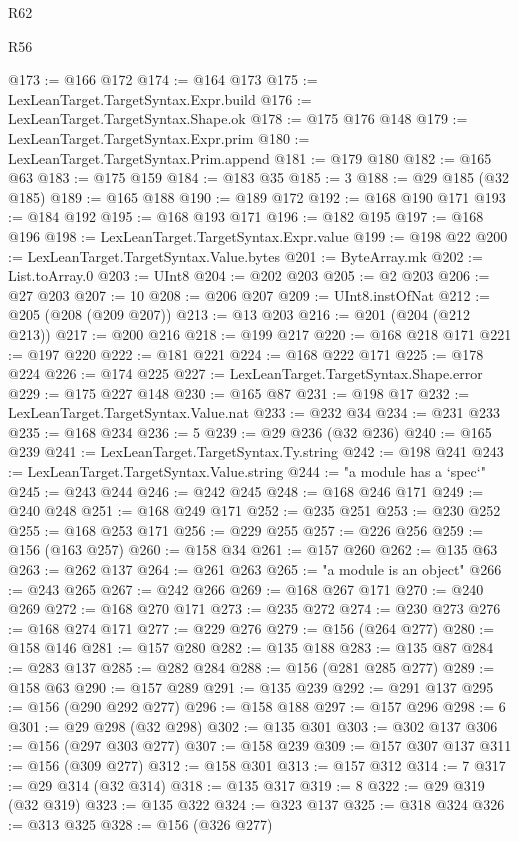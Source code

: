 \begin{lexlean}{R62}
\begin{lexlean}{R56}
\begin{coremodule}
{{{{{{{{{{{{{{{{{{{{{{{{{{{{{{{{{{{{{{{{{{{{{{{{{{{{{{{{{{{{{{{{{{{{{{{{{{{{{{{{{{{{{{{{{{{{{{{{{{{{{{{{{{{{{{{{{{{{{{{{{{{{{{{{{{{{{{{{{{{{{{{{{{{{{{{{{{{{{{{{{{{{{{{{{{{{{{{{{{{{{{{{{{{{{{{{{{{{{{{{{{{{{{{{{{{@173 := @166 @172
@174 := @164 @173
@175 := LexLeanTarget.TargetSyntax.Expr.build
@176 := LexLeanTarget.TargetSyntax.Shape.ok
@178 := @175 @176 @148
@179 := LexLeanTarget.TargetSyntax.Expr.prim
@180 := LexLeanTarget.TargetSyntax.Prim.append
@181 := @179 @180
@182 := @165 @63
@183 := @175 @159
@184 := @183 @35
@185 := 3
@188 := @29 @185 (@32 @185)
@189 := @165 @188
@190 := @189 @172
@192 := @168 @190 @171
@193 := @184 @192
@195 := @168 @193 @171
@196 := @182 @195
@197 := @168 @196
@198 := LexLeanTarget.TargetSyntax.Expr.value
@199 := @198 @22
@200 := LexLeanTarget.TargetSyntax.Value.bytes
@201 := ByteArray.mk
@202 := List.toArray.{0}
@203 := UInt8
@204 := @202 @203
@205 := @2 @203
@206 := @27 @203
@207 := 10
@208 := @206 @207
@209 := UInt8.instOfNat
@212 := @205 (@208 (@209 @207))
@213 := @13 @203
@216 := @201 (@204 (@212 @213))
@217 := @200 @216
@218 := @199 @217
@220 := @168 @218 @171
@221 := @197 @220
@222 := @181 @221
@224 := @168 @222 @171
@225 := @178 @224
@226 := @174 @225
@227 := LexLeanTarget.TargetSyntax.Shape.error
@229 := @175 @227 @148
@230 := @165 @87
@231 := @198 @17
@232 := LexLeanTarget.TargetSyntax.Value.nat
@233 := @232 @34
@234 := @231 @233
@235 := @168 @234
@236 := 5
@239 := @29 @236 (@32 @236)
@240 := @165 @239
@241 := LexLeanTarget.TargetSyntax.Ty.string
@242 := @198 @241
@243 := LexLeanTarget.TargetSyntax.Value.string
@244 := "a module has a `spec`"
@245 := @243 @244
@246 := @242 @245
@248 := @168 @246 @171
@249 := @240 @248
@251 := @168 @249 @171
@252 := @235 @251
@253 := @230 @252
@255 := @168 @253 @171
@256 := @229 @255
@257 := @226 @256
@259 := @156 (@163 @257)
@260 := @158 @34
@261 := @157 @260
@262 := @135 @63
@263 := @262 @137
@264 := @261 @263
@265 := "a module is an object"
@266 := @243 @265
@267 := @242 @266
@269 := @168 @267 @171
@270 := @240 @269
@272 := @168 @270 @171
@273 := @235 @272
@274 := @230 @273
@276 := @168 @274 @171
@277 := @229 @276
@279 := @156 (@264 @277)
@280 := @158 @146
@281 := @157 @280
@282 := @135 @188
@283 := @135 @87
@284 := @283 @137
@285 := @282 @284
@288 := @156 (@281 @285 @277)
@289 := @158 @63
@290 := @157 @289
@291 := @135 @239
@292 := @291 @137
@295 := @156 (@290 @292 @277)
@296 := @158 @188
@297 := @157 @296
@298 := 6
@301 := @29 @298 (@32 @298)
@302 := @135 @301
@303 := @302 @137
@306 := @156 (@297 @303 @277)
@307 := @158 @239
@309 := @157 @307 @137
@311 := @156 (@309 @277)
@312 := @158 @301
@313 := @157 @312
@314 := 7
@317 := @29 @314 (@32 @314)
@318 := @135 @317
@319 := 8
@322 := @29 @319 (@32 @319)
@323 := @135 @322
@324 := @323 @137
@325 := @318 @324
@326 := @313 @325
@328 := @156 (@326 @277)
}}}}}}}}}}}}}}}}}}}}}}}}}}}}}}}}}}}}}}}}}}}}}}}}}}}}}}}}}}}}}}}}}}}}}}}}}}}}}}}}}}}}}}}}}}}}}}}}}}}}}}}}}}}}}}}}}}}}}}}}}}}}}}}}}}}}}}}}}}}}}}}}}}}}}}}}}}}}}}}}}}}}}}}}}}}}}}}}}}}}}}}}}}}}}}}}}}}}}}}}}}}}}}}}}}}
\end{coremodule}
\end{lexlean}
\end{lexlean}
